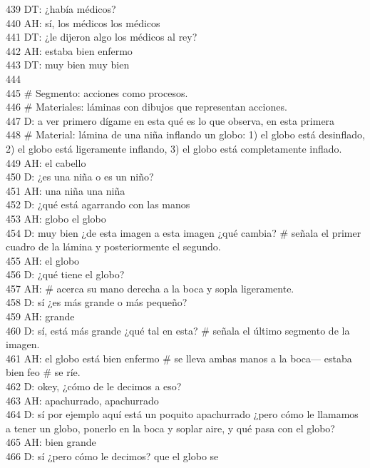 439 DT: ¿había médicos?\\
440 AH: sí, los médicos los médicos\\
441 DT: ¿le dijeron algo los médicos al rey?\\
442 AH: estaba bien enfermo\\
443 DT: muy bien muy bien\\
444 \\
445 \# Segmento: acciones como procesos.\\
446 \# Materiales: láminas con dibujos que representan acciones.\\
447 D: a ver primero dígame en esta qué es lo que observa, en esta primera\\
448 \# Material: lámina de una niña inflando un globo: 1) el globo está desinflado, 2) el globo está ligeramente inflando, 3) el globo está completamente inflado.\\
449 AH: el cabello\\
450 D: ¿es una niña o es un niño?\\
451 AH: una niña una niña\\
452 D: ¿qué está agarrando con las manos\\
453 AH: globo el globo\\
454 D: muy bien ¿de esta imagen a esta imagen ¿qué cambia? \# señala el primer cuadro de la lámina y posteriormente el segundo.\\
455 AH: el globo\\
456 D: ¿qué tiene el globo?\\
457 AH: \# acerca su mano derecha a la boca y sopla ligeramente.\\
458 D: sí ¿es más grande o más pequeño?\\
459 AH: grande\\
460 D: sí, está más grande ¿qué tal en esta? \# señala el último segmento de la imagen.\\
461 AH: el globo está bien enfermo \# se lleva ambas manos a la boca--- estaba bien feo \# se ríe.\\
462 D: okey, ¿cómo de le decimos a eso?\\
463 AH: apachurrado, apachurrado\\
464 D: sí por ejemplo aquí está un poquito apachurrado ¿pero cómo le llamamos a tener un globo, ponerlo en la boca y soplar aire, y qué pasa con el globo?\\
465 AH: bien grande\\
466 D: sí ¿pero cómo le decimos? que el globo se\\
